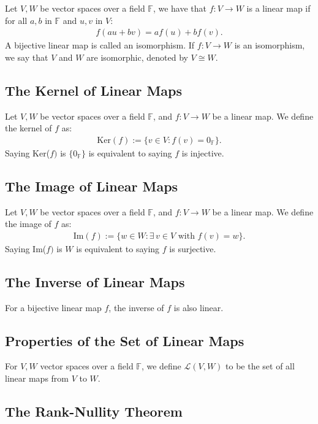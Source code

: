 \documentclass[a4paper, 12pt, twoside]{article}
\begin{document}
Let $V, W$ be vector spaces over a field $\mathbb{F}$, we have that
$f:V \to W$ is a linear map if for all $a, b$ in $\mathbb{F}$ and
$u, v$ in $V$: \begin{gather*}
  f(au+bv) = af(u) + bf(v).
\end{gather*} A bijective linear map is called an isomorphism.
If $f: V \to W$ is an isomorphism, we say that $V$ and $W$ are 
isomorphic, denoted by $V \cong W$. 

\subsection{The Kernel of Linear Maps}

Let $V, W$ be vector spaces over a field $\mathbb{F}$, and
$f : V \to W$ be a linear map. We define the kernel of $f$ as: \begin{gather*}
  \text{Ker}(f) := \{v \in V : f(v) = 0_{\mathbb{F}}\}.
\end{gather*} Saying Ker($f)$ is $\{0_\mathbb{F}\}$ is equivalent
to saying $f$ is injective.

\subsection{The Image of Linear Maps}

Let $V, W$ be vector spaces over a field $\mathbb{F}$, and
$f : V \to W$ be a linear map. We define the image of $f$ as: \begin{gather*}
  \text{Im}(f) := \{w \in W : \exists \, v \in V \text{ with } f(v) = w\}.
\end{gather*} Saying Im($f)$ is $W$ is equivalent
to saying $f$ is surjective.

\subsection{The Inverse of Linear Maps}

For a bijective linear map $f$, the inverse of $f$ is also linear.

\subsection{Properties of the Set of Linear Maps}

For $V, W$ vector spaces over a field $\mathbb{F}$, we define
$\mathcal{L}(V, W)$ to be the set of all linear maps from $V$
to $W$.

\subsection{The Rank-Nullity Theorem}
\end{document}
